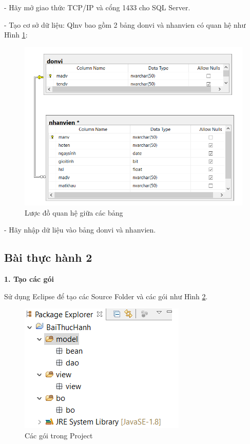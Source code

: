 - Hãy mở giao thức TCP/IP và cổng 1433 cho SQL Server.
 
 - Tạo cơ sở dữ liệu: Qlnv bao gồm 2 bảng donvi và nhanvien có quan hệ như   Hình \ref{hinh39_1}:
 
 \begin{figure}[!ht]
 	\centering
 	\includegraphics[scale=0.7]{Figures//Hinh39_1.png}
 	\caption{ Lược đồ quan hệ giữa các bảng }\label{hinh39_1} 
 \end{figure}
 
 - Hãy nhập dữ liệu vào bảng donvi và nhanvien.
\subsection{Bài thực hành 2}
\textbf{1. Tạo các gói}

Sử dụng Eclipse để tạo các Source Folder và các gói như Hình \ref{hinh39}.
	\begin{figure}[!ht]
	\centering
	\includegraphics[scale=0.9]{Figures//Hinh39.png}
	\caption{ Các gói trong Project }\label{hinh39} 
\end{figure}

